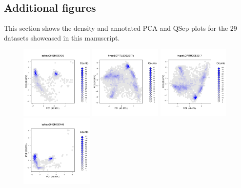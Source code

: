 \documentclass[12pt]{article}\usepackage[]{graphicx}\usepackage[]{color}
\begin{document}
\begin{appendices}

\section{Additional figures}\label{sec:figs}

This section shows the density and annotated PCA and QSep plots for
the 29 datasets showcased in this manuscript.

\begin{figure}[htb]
  \centering
  \includegraphics[width = 0.32\textwidth]{./figure/fighexpca-1.pdf}
  \includegraphics[width = 0.32\textwidth]{./figure/fighexpca-2.pdf}
  \includegraphics[width = 0.32\textwidth]{./figure/fighexpca-3.pdf}
  \includegraphics[width = 0.32\textwidth]{./figure/fighexpca-4.pdf}

\end{figure}
\end{appendices}
\end{document}
